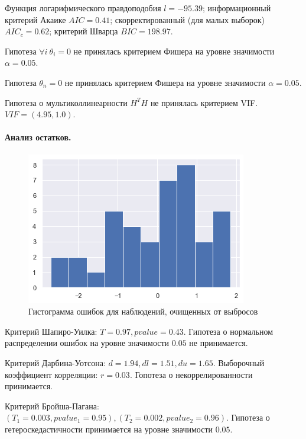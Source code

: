 \documentclass[a4paper,12pt]{article}
\begin{document}
Функция логарифмического правдоподобия $l = -95.39$; информационный критерий Акаике $AIC = 0.41$; скорректированный (для малых выборок) $AIC_c = 0.62$; критерий Шварца $BIC = 198.97$.

Гипотеза $\forall i~\theta_i=0$ не принялась критерием Фишера на уровне значимости $\alpha = 0.05$.

Гипотеза $\theta_n = 0$ не принялась критерием Фишера на уровне значимости $\alpha = 0.05$.

Гипотеза о мультиколлинеарности $H^T H$ не принялась критерием VIF. $VIF = (4.95, 1.0)$.


\paragraph{Анализ остатков.\\}
\begin{figure}
    \vspace{-2ex}
    \includegraphics[width=\linewidth]{src/img/гистограмма_ошибок_без_выбросов.png}
    \caption{Гистограмма ошибок для наблюдений, очищенных от выбросов}
\end{figure}

Критерий Шапиро-Уилка: $T = 0.97, pvalue = 0.43$. Гипотеза о нормальном распределении ошибок на уровне значимости $0.05$ не принимается.

Критерий Дарбина-Уотсона: $d = 1.94, dl=1.51, du=1.65$. Выборочный коэффициент корреляции: $r = 0.03$. Гопотеза о некоррелированности принимается.

Критерий Бройша-Пагана: $(T_1 = 0.003, pvalue_1 = 0.95), (T_2 = 0.002, pvalue_2 = 0.96)$. Гипотеза о гетероскедастичности принимается на уровне значимости $0.05$.
\end{document}
